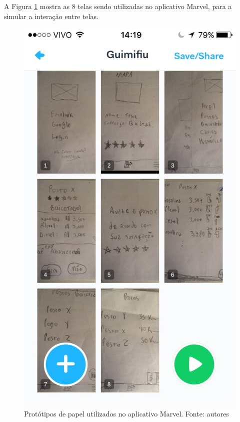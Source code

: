 A Figura \ref{img:prototipo_de_papel_marvel} mostra as 8 telas sendo utilizadas no aplicativo Marvel, para a simular a interação entre telas.
\begin{figure}[H]
    \centering
    \includegraphics[scale=0.3]{figuras/prototipo_de_paple_marvel.jpg}
    \caption[Protótipos de papel utilizados no aplicativo Marvel]{Protótipos de papel utilizados no aplicativo Marvel. Fonte: autores}
    \label{img:prototipo_de_papel_marvel}
\end{figure}
 \pagebreak

